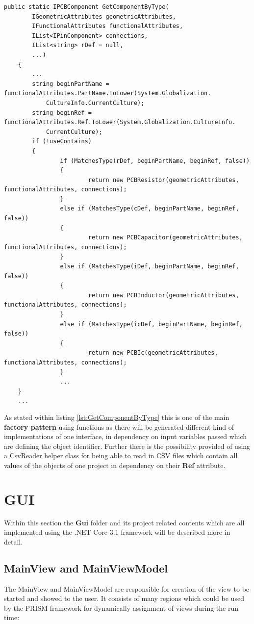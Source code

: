\begin{lstlisting}[language={[Sharp]C},caption={GetComponentByType},captionpos=b,label=lst:GetComponentByType]
	public static IPCBComponent GetComponentByType(
		IGeometricAttributes geometricAttributes,
		IFunctionalAttributes functionalAttributes,
		IList<IPinComponent> connections,
		IList<string> rDef = null,
		...)
	{
		...
		string beginPartName = functionalAttributes.PartName.ToLower(System.Globalization.
			CultureInfo.CurrentCulture);
		string beginRef = functionalAttributes.Ref.ToLower(System.Globalization.CultureInfo.
			CurrentCulture);
		if (!useContains)
		{
				if (MatchesType(rDef, beginPartName, beginRef, false))
				{
						return new PCBResistor(geometricAttributes, functionalAttributes, connections);
				}
				else if (MatchesType(cDef, beginPartName, beginRef, false))
				{
						return new PCBCapacitor(geometricAttributes, functionalAttributes, connections);
				}
				else if (MatchesType(iDef, beginPartName, beginRef, false))
				{
						return new PCBInductor(geometricAttributes, functionalAttributes, connections);
				}
				else if (MatchesType(icDef, beginPartName, beginRef, false))
				{
						return new PCBIc(geometricAttributes, functionalAttributes, connections);
				}
				...
	}
	...
\end{lstlisting}

As stated within listing \ref{lst:GetComponentByType} this is one of the main \textbf{factory pattern} using functions as there will be generated different kind of implementations of one interface, in dependency on input variables passed which are defining the object identifier. Further there is the possibility provided of using a CsvReader helper class for being able to read in \ac{CSV} files which contain all values of the objects of one project in dependency on their \textbf{Ref} attribute.

	\section{GUI}
Within this section the \textbf{Gui} folder and its project related contents which are all implemented using the .NET Core 3.1 framework will be described more in detail.

		\subsection{MainView and MainViewModel}
The MainView and MainViewModel are responsible for creation of the view to be started and showed to the user. It consists of many regions which could be used by the PRISM framework for dynamically assignment of views during the run time:

